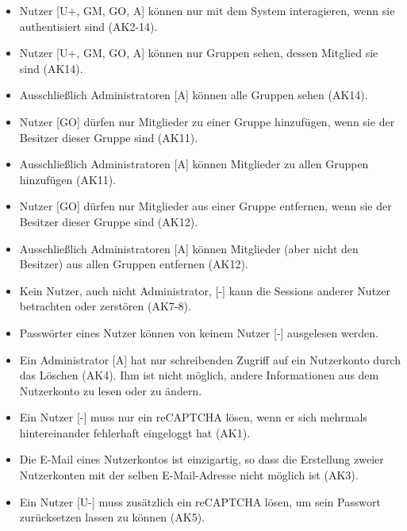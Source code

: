 \documentclass[fontsize=12pt,DIV=14,BCOR=10mm,a4paper,parskip=half-,ngerman,english,bibliography=totocnumbered]{scrreprt}
\begin{document}
\label{security-policies:new_policies}
\begin{itemize}
  \item Nutzer [U+, GM, GO, A] können nur mit dem System interagieren, wenn sie authentisiert sind (AK2-14).
  \item Nutzer [U+, GM, GO, A] können nur Gruppen sehen, dessen Mitglied sie sind (AK14).
  \item Ausschließlich Administratoren [A] können alle Gruppen sehen (AK14).
  \item Nutzer [GO] dürfen nur Mitglieder zu einer Gruppe hinzufügen, wenn sie der Besitzer dieser Gruppe sind (AK11).
  \item Ausschließlich Administratoren [A] können Mitglieder zu allen Gruppen hinzufügen (AK11).
  \item Nutzer [GO] dürfen nur Mitglieder aus einer Gruppe entfernen, wenn sie der Besitzer dieser Gruppe sind (AK12).
  \item Ausschließlich Administratoren [A] können Mitglieder (aber nicht den Besitzer) aus allen Gruppen entfernen (AK12).
  \item Kein Nutzer, auch nicht Administrator, [-] kann die Sessions anderer Nutzer betrachten oder zerstören (AK7-8).
  \item Passwörter eines Nutzer können von keinem Nutzer [-] ausgelesen werden.
  \item Ein Administrator [A] hat nur schreibenden Zugriff auf ein Nutzerkonto durch das Löschen (AK4). Ihm ist nicht möglich, andere Informationen aus dem Nutzerkonto zu lesen oder zu ändern.
  \item Ein Nutzer [-] muss nur ein reCAPTCHA lösen, wenn er sich mehrmals hintereinander fehlerhaft eingeloggt hat (AK1).
  \item Die E-Mail eines Nutzerkontos ist einzigartig, so dass die Erstellung zweier Nutzerkonten mit der selben E-Mail-Adresse nicht möglich ist (AK3).
  \item Ein Nutzer [U-] muss zusätzlich ein reCAPTCHA lösen, um sein Passwort zurücksetzen lassen zu können (AK5).
\end{itemize}

\clearpage

\printbibliography

\printacronyms[title=Abkürzungsverzeichnis,toctitle=Abkürzungsverzeichnis]
\printglossary[type=main]

\end{document}
